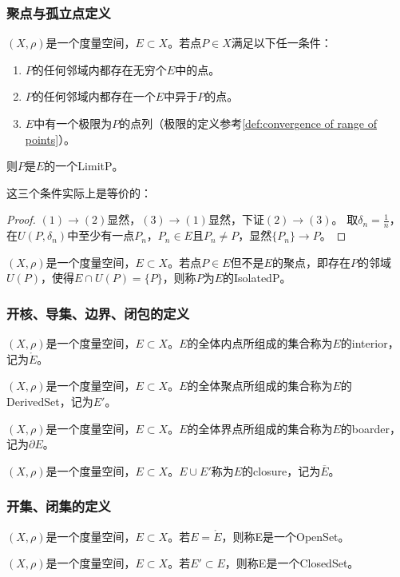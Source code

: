 \subsubsection{聚点与孤立点定义}
\begin{definition}
	$(X,\rho)$是一个度量空间，$E\subset X$。若点$P\in X$满足以下任一条件：
	\begin{enumerate}
		\item $P$的任何邻域内都存在无穷个$E$中的点。
		\item $P$的任何邻域内都存在一个$E$中异于$P$的点。
		\item $E$中有一个极限为$P$的点列（极限的定义参考\cref{def:convergence of range of points}）。
	\end{enumerate}
	则$P$是$E$的一个\gls{LimitP}。
\end{definition}
这三个条件实际上是等价的：
\begin{proof}
	$(1)\to(2)$显然，$(3)\to(1)$显然，下证$(2)\to(3)$。
	取$\delta_n=\frac{1}{n}$，在$U(P,\delta_n)$中至少有一点$P_n$，$P_n\in E$且$P_n\ne P$，显然$\{P_n\}\to P$。
\end{proof}
\begin{definition}
	$(X,\rho)$是一个度量空间，$E\subset X$。若点$P\in E$但不是$E$的聚点，即存在$P$的邻域$U(P)$，使得$E\cap U(P)=\{P\}$，则称$P$为$E$的\gls{IsolatedP}。
\end{definition}
\subsubsection{开核、导集、边界、闭包的定义}
\begin{definition}
	$(X,\rho)$是一个度量空间，$E\subset X$。$E$的全体内点所组成的集合称为$E$的\gls{interior}，记为$\mathring{E}$。
\end{definition}
\begin{definition}
	$(X,\rho)$是一个度量空间，$E\subset X$。$E$的全体聚点所组成的集合称为$E$的\gls{DerivedSet}，记为$E'$。
\end{definition}
\begin{definition}
	$(X,\rho)$是一个度量空间，$E\subset X$。$E$的全体界点所组成的集合称为$E$的\gls{boarder}，记为$\partial E$。
\end{definition}
\begin{definition}
	$(X,\rho)$是一个度量空间，$E\subset X$。$E\cup E'$称为$E$的\gls{closure}，记为$\overline{E}$。
\end{definition}
\subsubsection{开集、闭集的定义}
\begin{definition}
	$(X,\rho)$是一个度量空间，$E\subset X$。若$E=\mathring{E}$，则称E是一个\gls{OpenSet}。
\end{definition}
\begin{definition}
	$(X,\rho)$是一个度量空间，$E\subset X$。若$E'\subset E$，则称E是一个\gls{ClosedSet}。
\end{definition}
